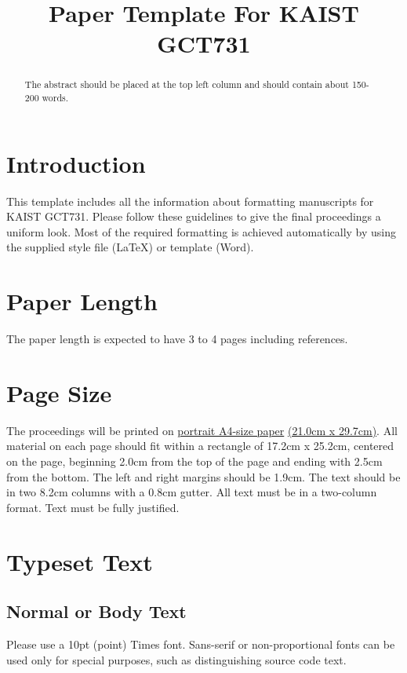 \documentclass{article}
\title{Paper Template For KAIST GCT731}
\begin{document}
%
\maketitle
%
\begin{abstract}
The abstract should be placed at the top left column and should contain about 150-200 words.
\end{abstract}
%
\section{Introduction}\label{sec:introduction}

This template includes all the information about formatting manuscripts for KAIST GCT731.
Please follow these guidelines to give the final proceedings a uniform look.
Most of the required formatting is achieved automatically by using the supplied
style file (\LaTeX) or template (Word).

%
\section{Paper Length}
The paper length is expected to have 3 to 4 pages including references. 

\section{Page Size}\label{sec:page_size}

The proceedings will be printed on
 \underline{portrait A4-size paper} \underline{(21.0cm x 29.7cm)}.
All material on each page should fit within a rectangle of 17.2cm x 25.2cm,
centered on the page, beginning 2.0cm
from the top of the page and ending with 2.5cm from the bottom.
The left and right margins should be 1.9cm.
The text should be in two 8.2cm columns with a 0.8cm gutter.
All text must be in a two-column format.
Text must be fully justified.

\section{Typeset Text}\label{sec:typeset_text}

\subsection{Normal or Body Text}\label{subsec:body}

Please use a 10pt (point) Times font. Sans-serif or non-proportional fonts
can be used only for special purposes, such as distinguishing source code text.
\end{document}
